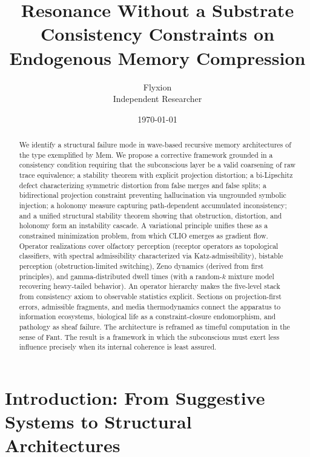 \documentclass[12pt,a4paper]{article}
\title{\textbf{Resonance Without a Substrate}\\
\large Consistency Constraints on Endogenous Memory Compression}
\author{Flyxion\\[0.4em]\small Independent Researcher}
\date{\today}
\begin{document}
\maketitle

\begin{abstract}
We identify a structural failure mode in wave-based recursive memory architectures of the type exemplified by Mem. We propose a corrective framework grounded in a consistency condition requiring that the subconscious layer be a valid coarsening of raw trace equivalence; a stability theorem with explicit projection distortion; a bi-Lipschitz defect characterizing symmetric distortion from false merges and false splits; a bidirectional projection constraint preventing hallucination via ungrounded symbolic injection; a holonomy measure capturing path-dependent accumulated inconsistency; and a unified structural stability theorem showing that obstruction, distortion, and holonomy form an instability cascade. A variational principle unifies these as a constrained minimization problem, from which CLIO emerges as gradient flow. Operator realizations cover olfactory perception (receptor operators as topological classifiers, with spectral admissibility characterized via Katz-admissibility), bistable perception (obstruction-limited switching), Zeno dynamics (derived from first principles), and gamma-distributed dwell times (with a random-$k$ mixture model recovering heavy-tailed behavior). An operator hierarchy makes the five-level stack from consistency axiom to observable statistics explicit. Sections on projection-first errors, admissible fragments, and media thermodynamics connect the apparatus to information ecosystems, biological life as a constraint-closure endomorphism, and pathology as sheaf failure. The architecture is reframed as timeful computation in the sense of Fant. The result is a framework in which the subconscious must exert less influence precisely when its internal coherence is least assured.
\end{abstract}

\newpage

\tableofcontents
\newpage

\section{Introduction: From Suggestive Systems to Structural Architectures}
\end{document}

